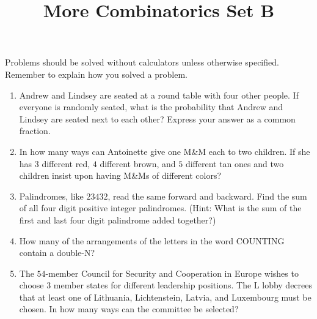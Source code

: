 \documentclass{article}
\title{More Combinatorics Set B}
\author{}
\date{}
\begin{document}
    \maketitle
    \noindent Problems should be solved without calculators unless otherwise specified.
    Remember to explain how you solved a problem.
    \begin{enumerate}
        \item Andrew and Lindsey are seated at a round table with four other people. If
        everyone is randomly seated, what is the probability that Andrew and Lindsey are
        seated next to each other? Express your answer as a common fraction.
        \vspace{3cm}
        \item In how many ways can Antoinette give one M\&M each to two children. If she has 
        $3$ different red, $4$ different brown, and $5$ different tan ones and two children 
        insist upon having M\&Ms of different colors?
        \vspace{3cm}
        \item Palindromes, like $23432$, read the same forward and backward. Find the sum of 
        all four digit positive integer palindromes. (Hint: What is the sum of the first and 
        last four digit palindrome added together?)
        \vspace{3cm}
        \item How many of the arrangements of the letters in the word COUNTING contain a
        double-N?
        \vspace{3cm}
        \item The $54$-member Council for Security and Cooperation in Europe wishes to 
        choose $3$ member states for different leadership positions. The L lobby decrees that 
        at least one of Lithuania, Lichtenstein, Latvia, and Luxembourg must be chosen. In 
        how many ways can the committee be selected?
        \vspace{3cm}
    \end{enumerate}
\end{document}
